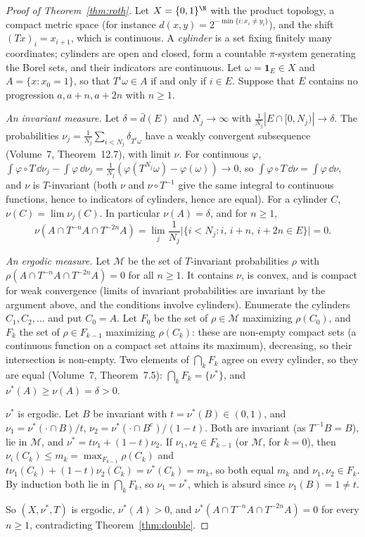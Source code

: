 \begin{proof}[Proof of Theorem~\ref{thm:roth}]
Let $X=\{0,1\}^\N$ with the product topology, a compact metric space (for instance $d(x,y)=2^{-\min\{i:x_i\neq y_i\}}$), and the shift $(Tx)_i=x_{i+1}$, which is continuous. A \emph{cylinder} is a set fixing finitely many coordinates;
cylinders are open and closed, form a countable $\pi$-system generating the Borel sets, and their indicators are continuous. Let $\omega=\mathbf 1_E\in X$ and $A=\{x:x_0=1\}$, so that $T^i\omega\in A$ if and only if $i\in E$.
Suppose that $E$ contains no progression $a,a+n,a+2n$ with $n\ge1$.

\emph{An invariant measure.} Let $\delta=\bar d(E)$ and $N_j\to\infty$ with $\frac1{N_j}|E\cap[0,N_j)|\to\delta$. The probabilities $\nu_j=\frac1{N_j}\sum_{i<N_j}\delta_{T^i\omega}$ have a weakly convergent subsequence (Volume~7, Theorem~12.7), with limit $\nu$.
For continuous $\varphi$, $\int\varphi\circ T\,\dd\nu_j-\int\varphi\,\dd\nu_j=\frac1{N_j}(\varphi(T^{N_j}\omega)-\varphi(\omega))\to0$, so $\int\varphi\circ T\,\dd\nu=\int\varphi\,\dd\nu$, and $\nu$ is $T$-invariant (both $\nu$ and $\nu\circ T^{-1}$ give the same
integral to continuous functions, hence to indicators of cylinders, hence are equal). For a cylinder $C$, $\nu(C)=\lim\nu_j(C)$. In particular $\nu(A)=\delta$, and for $n\ge1$,
\[
\nu(A\cap T^{-n}A\cap T^{-2n}A)=\lim_j\frac1{N_j}\bigl|\{i<N_j:i,\,i+n,\,i+2n\in E\}\bigr|=0.
\]

\emph{An ergodic measure.} Let $\mathcal M$ be the set of $T$-invariant probabilities $\rho$ with $\rho(A\cap T^{-n}A\cap T^{-2n}A)=0$ for all $n\ge1$. It contains $\nu$, is convex, and is compact for weak convergence (limits of invariant
probabilities are invariant by the argument above, and the conditions involve cylinders). Enumerate the cylinders $C_1,C_2,\dots$ and put $C_0=A$. Let $F_0$ be the set of $\rho\in\mathcal M$ maximizing $\rho(C_0)$, and $F_k$ the set of $\rho\in F_{k-1}$ maximizing $\rho(C_k)$:
these are non-empty compact sets (a continuous function on a compact set attains its maximum), decreasing, so their intersection is non-empty. Two elements of $\bigcap_kF_k$ agree on every cylinder, so they are equal (Volume~7, Theorem~7.5):
$\bigcap_kF_k=\{\nu^*\}$, and $\nu^*(A)\ge\nu(A)=\delta>0$.

$\nu^*$ is ergodic. Let $B$ be invariant with $t=\nu^*(B)\in(0,1)$, and $\nu_1=\nu^*(\cdot\cap B)/t$, $\nu_2=\nu^*(\cdot\cap B^c)/(1-t)$. Both are invariant (as $T^{-1}B=B$), lie in $\mathcal M$, and $\nu^*=t\nu_1+(1-t)\nu_2$. If $\nu_1,\nu_2\in F_{k-1}$
(or $\mathcal M$, for $k=0$), then $\nu_i(C_k)\le m_k=\max_{F_{k-1}}\rho(C_k)$ and $t\nu_1(C_k)+(1-t)\nu_2(C_k)=\nu^*(C_k)=m_k$, so both equal $m_k$ and $\nu_1,\nu_2\in F_k$. By induction both lie in $\bigcap_kF_k$, so $\nu_1=\nu^*$, which is absurd since
$\nu_1(B)=1\neq t$.

So $(X,\nu^*,T)$ is ergodic, $\nu^*(A)>0$, and $\nu^*(A\cap T^{-n}A\cap T^{-2n}A)=0$ for every $n\ge1$, contradicting Theorem~\ref{thm:double}.
\end{proof}

